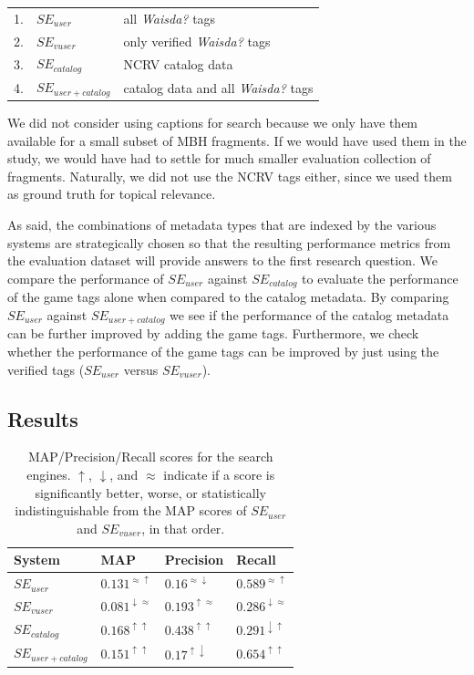 \begin{tabular}{lll}
 1. & $SE_{user}$  & all \textit{Waisda?} tags \\
 2. & $SE_{vuser}$& only verified \textit{Waisda?} tags \\
 3. & $SE_{catalog}$&  NCRV catalog data \\
 4. & $SE_{user+catalog}$&  catalog data and all \textit{Waisda?}  tags \\
\end{tabular}

We did not consider using captions for search because we only have them available for a small subset of MBH fragments. If we would have used them in the study, we would have had to settle for much smaller evaluation collection of fragments. Naturally, we did not use the NCRV tags either, since we used them as ground truth for topical relevance.

As said, the combinations of metadata types that are indexed by the various systems are strategically chosen so that the resulting performance metrics from the evaluation dataset will provide answers to the first research question. We compare the performance of $SE_{user}$ against $SE_{catalog}$ to evaluate the performance of the game tags alone when compared to the catalog metadata. By comparing $SE_{user}$ against $SE_{user+catalog}$ we see if the performance of the catalog metadata can be further improved by adding the game tags. Furthermore, we check whether the performance of the game tags can be improved by just using the verified tags ($SE_{user}$ versus $SE_{vuser}$).

\subsection{Results}\label{sec:topicir:results}

\begin{table}[tb]
\centering
\begin{footnotesize}
\begin{tabular}{l|l|l|l}
\toprule
System & MAP & Precision & Recall \\
\hline
$SE_{user}$ & $0.131^{\approx \uparrow}$ & $0.16^{\approx \downarrow}$ & $0.589^{\approx \uparrow}$ \\
\hline
$SE_{vuser}$ & $0.081^{\downarrow \approx}$ & $0.193^{\uparrow \approx}$ & $0.286^{\downarrow \approx}$ \\
\hline
$SE_{catalog}$ & $0.168^{\uparrow \uparrow}$ & $0.438^{\uparrow \uparrow}$ &	$0.291^{\downarrow \uparrow}$ \\
\hline
$SE_{user+catalog}$ & $0.151^{\uparrow \uparrow}$ & $0.17^{\uparrow \downarrow}$ & $0.654^{\uparrow \uparrow}$ \\
\bottomrule
\end{tabular}
\caption{MAP/Precision/Recall scores for the search engines. $\uparrow$, $\downarrow$, and $\approx$ indicate if a score is significantly better, worse, or statistically indistinguishable from the MAP scores of $SE_{user}$ and $SE_{vuser}$, in that order.}
\label{topicir:table:map-prec-rec}
\end{footnotesize}
\end{table}

